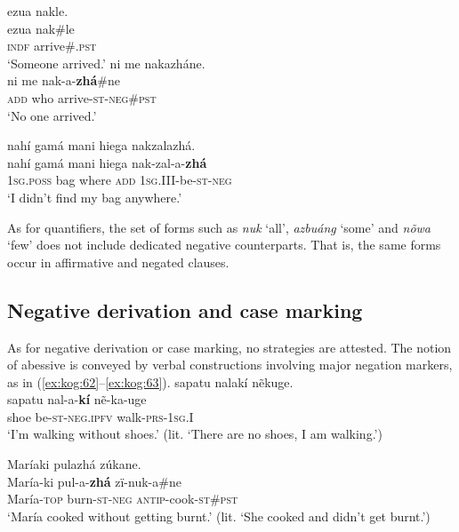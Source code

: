 \documentclass[output=paper,colorlinks,citecolor=brown]{langscibook}
\begin{document}
\ea\label{ex:kog:60}
    \ea\label{ex:kog:60a}ezua nakle.\\
        \gll  ezua nak\#le\\ 
               \textsc{indf} arrive\#\textsc{.pst}\\
        \glt  ‘Someone arrived.’
\newpage
    \ex\label{ex:kog:60b}ni me nakazháne.\\
        \gll  ni me nak-a{}-\textbf{zhá}\#ne\\
              \textsc{add} who arrive\textsc{{}-st{}-neg\#pst}\\
        \glt ‘No one arrived.’
    \z
\z 

\ea\label{ex:kog:61} nahí gamá mani hiega nakzalazhá.\\
    \gll  nahí gamá mani hiega nak{}-zal{}-a{}-\textbf{zhá}\\ 
          1\textsc{sg.poss} bag where \textsc{add} \textsc{1sg.III{}-}be{}-\textsc{st{}-neg}\\
    \glt  ‘I didn't find my bag anywhere.’
\z 

As for quantifiers, the set of forms such as \textit{nuk} ‘all’, \textit{azbuáng} ‘some’ and \textit{nõwa} ‘few’ does not include dedicated negative counterparts. That is, the same forms occur in affirmative and negated clauses.

\subsection{Negative derivation and case marking}\label{sec:kog:3.3}

As for negative derivation or case marking, no strategies are attested. The notion of abessive is conveyed by verbal constructions involving major negation markers, as in (\ref{ex:kog:62}--\ref{ex:kog:63}).
\ea\label{ex:kog:62} sapatu nalakí  nẽkuge.\\
    \gll   sapatu nal{}-a-\textbf{kí} nẽ-ka-uge\\
           shoe be\textsc{{}-st{}-neg.ipfv} walk\textsc{{}-prs-1sg.I}\\
    \glt  ‘I'm walking without shoes.’ (lit. ‘There are no shoes, I am walking.')
\z 

\ea\label{ex:kog:63} Maríaki pulazhá zúkane.\\ 
    \gll María-ki pul{}-a-\textbf{zhá} zï{}-nuk{}-a\#ne\\
          María-\textsc{top} burn{}-\textsc{st{}-neg} \textsc{antip{}-}cook{}-\textsc{st}\#\textsc{pst}\\
    \glt ‘María cooked without getting burnt.’ (lit. ‘She cooked and didn't get burnt.')
\z 
\end{document}
